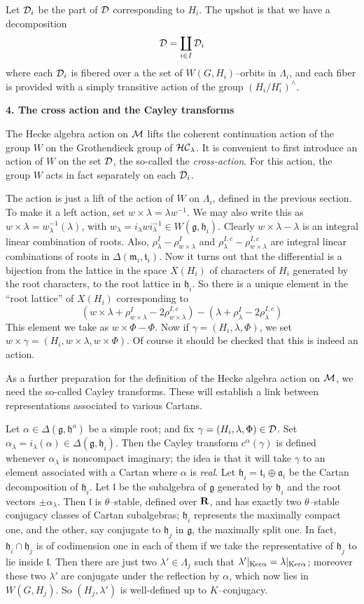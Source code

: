\documentclass[11 pt]{article}
\def\1{^{-1}}
\def\a{\alpha}
\def\af{{\mathfrak a}}
\def\D{{\cal D}}
\def\F{\Phi}
\def\g{\gamma}
\def\gf{{\mathfrak g}}
\def\HC{{\cal HC}}
\def\hf{{\mathfrak h}}
\def\Ker{{\rm Ker}}
\def\L{\Lambda}
\def\l{\lambda}
\def\lf{{\mathfrak l}}
\def\M{{\cal M}}
\def\mf{{\mathfrak m}}
\def\R{{\bf R}}
\def\t{\theta}
\def\tf{{\mathfrak t}}
\begin{document}
Let $\D_i$ be the part of $\D$ corresponding to $H_i$. The upshot is that we
have a decomposition
$$
\D=\coprod_{i\in I}\D_i
$$
where each $\D_i$ is fibered over a the set of $W(G,H_i)$--orbits
in $\L_i$, and each fiber is provided with a simply transitive action of the
group $(H_i/H_i^\circ)^{\wedge}$.

\bigskip

\noindent\textbf{4. The cross action and the Cayley transforms}

\medskip

The Hecke algebra action on $\M$ lifts the coherent
continuation action of the group $W$ on the Grothendieck group of $\HC_\l$.
It is convenient to first introduce an action of $W$ on the set $\D$, the
so-called the \textit{cross-action}. For this action, the group $W$ acts in
fact separately on each $\D_i$.

The action is just a lift of the action of $W$ on $\L_i$, defined in the
previous section. To make it a left action, set $w\times\l=\l w\1$. We may
also write this as $w\times\l=w_\l\1(\l)$, with $w_\l=i_\l wi_\l\1\in
W(\gf,\hf_i)$. Clearly $w\times\l-\l$ is an integral linear combination of
roots. Also, $\rho^I_\l-\rho^I_{w\times\l}$ and
$\rho^{I,c}_\l-\rho^{I,c}_{w\times\l}$ are integral linear combinations of
roots in $\Delta(\mf_i,\tf_i)$. Now it turns out that the differential is
a bijection from the lattice in the space $X(H_i)$ of characters of $H_i$
generated by the root characters, to the root lattice in $\hf_i$. So there is
a unique element in the ``root lattice'' of $X(H_i)$ corresponding to
$$
(w\times\l+\rho^I_{w\times\l}-2\rho^{I,c}_{w\times\l})
-(\l+\rho^I_\l-2\rho^{I,c}_\l)
$$
This element we take as $w\times\F-\F$. Now if $\g=(H_i,\l,\F)$, we set
$w\times\g=(H_i,w\times\l,w\times\F)$. Of course it should be checked that
this is indeed an action.

\medskip

As a further preparation for the definition of the Hecke algebra action on
$\M$, we need the so-called Cayley transforms. These will establish a link
between representations associated to various Cartans.

Let $\a\in\Delta(\gf,\hf^a)$ be a simple root; and fix $\g=(H_i,\l,\F)\in\D$.
Set $\a_\l=i_\l(\a)\in\Delta(\gf,\hf_i)$. Then the Cayley transform $c^\a(\g)$
is defined whenever $\a_\l$ is noncompact imaginary; the idea is that it will
take $\g$ to an element associated with a Cartan where $\a$ is {\em real}. Let
$\hf_i=\tf_i\oplus\af_i$ be the Cartan decomposition of $\hf_i$. Let $\lf$ be
the subalgebra of $\gf$ generated by $\hf_i$ and the root vectors $\pm\a_\l$.
Then $\lf$ is $\t$--stable, defined over $\R$, and has exactly two $\t$--stable
conjugacy classes of Cartan subalgebras; $\hf_i$ represents the maximally
compact one, and the other, say conjugate to $\hf_j$ in $\gf$, the maximally
split one. In fact, $\hf_i\cap\hf_j$ is of codimension one in each of them
if we take the representative of $\hf_j$ to lie inside $\lf$. Then there are
just two $\l'\in\L_j$ such that $\l'|_{\Ker\a}=\l|_{\Ker\a}$; moreover these
two $\l'$ are conjugate under the reflection by $\a$, which now lies in
$W(G,H_j)$. So $(H_j,\l')$ is well-defined up to $K$--conjugacy.
\end{document}
